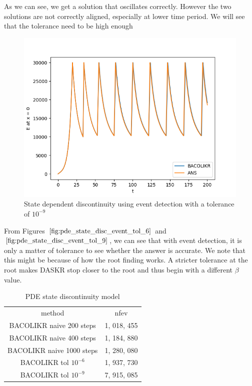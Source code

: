 \documentclass{article}
\begin{document}
As we can see, we get a solution that oscillates correctly. However the two solutions are not correctly aligned, especially at lower time period. We will see that the tolerance need to be high enough

\begin{figure}[H]
\centering
\includegraphics[width=0.7\linewidth]{./figures/pde_state_disc_event_tol_9}
\caption{State dependent discontinuity using event detection with a tolerance of $10^{-9}$}
\label{fig:pde_state_disc_event_tol_9}
\end{figure}

From Figures $\ref{fig:pde_state_disc_event_tol_6}$ and $\ref{fig:pde_state_disc_event_tol_9}$, we can see that with event detection, it is only a matter of tolerance to see whether the answer is accurate. We note that this might be because of how the root finding works. A stricter tolerance at the root makes DASKR stop closer to the root and thus begin with a different $\beta$ value.

\begin{table}[h]
\caption {PDE state discontinuity model} 
\label{tab:pde_state_nfev}
\begin{center}
\begin{tabular}{ c c } 
method                    & nfev \\ 
BACOLIKR naive 200 steps  & 1, 018, 455    \\
BACOLIKR naive 400 steps  & 1, 184, 880    \\
BACOLIKR naive 1000 steps & 1, 280, 080    \\
BACOLIKR tol $10^{-6}$    & 1, 937, 730    \\
BACOLIKR tol $10^{-9}$    & 7, 915, 085    \\
\end{tabular}
\end{center}
\end{table} 
\end{document}
